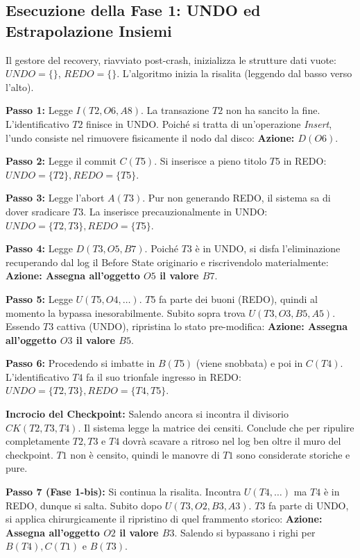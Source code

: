 \subsection{Esecuzione della Fase 1: UNDO ed Estrapolazione Insiemi}
Il gestore del recovery, riavviato post-crash, inizializza le strutture dati vuote: $UNDO=\{\}$, $REDO=\{\}$. L'algoritmo inizia la risalita (leggendo dal basso verso l'alto).

\textbf{Passo 1:} Legge $I(T2, O6, A8)$. La transazione $T2$ non ha sancito la fine. L'identificativo $T2$ finisce in UNDO. Poiché si tratta di un'operazione \textit{Insert}, l'undo consiste nel rimuovere fisicamente il nodo dal disco: \textbf{Azione: $D(O6)$}.

\textbf{Passo 2:} Legge il commit $C(T5)$. Si inserisce a pieno titolo $T5$ in REDO: $UNDO=\{T2\}, REDO=\{T5\}$.

\textbf{Passo 3:} Legge l'abort $A(T3)$. Pur non generando REDO, il sistema sa di dover sradicare $T3$. La inserisce precauzionalmente in UNDO: $UNDO=\{T2, T3\}, REDO=\{T5\}$.

\textbf{Passo 4:} Legge $D(T3, O5, B7)$. Poiché $T3$ è in UNDO, si disfa l'eliminazione recuperando dal log il Before State originario e riscrivendolo materialmente: \textbf{Azione: Assegna all'oggetto $O5$ il valore $B7$}.

\textbf{Passo 5:} Legge $U(T5, O4, \dots)$. $T5$ fa parte dei buoni (REDO), quindi al momento la bypassa inesorabilmente. Subito sopra trova $U(T3, O3, B5, A5)$. Essendo $T3$ cattiva (UNDO), ripristina lo stato pre-modifica: \textbf{Azione: Assegna all'oggetto $O3$ il valore $B5$}.

\textbf{Passo 6:} Procedendo si imbatte in $B(T5)$ (viene snobbata) e poi in $C(T4)$. L'identificativo $T4$ fa il suo trionfale ingresso in REDO: $UNDO=\{T2, T3\}, REDO=\{T4, T5\}$.

\textbf{Incrocio del Checkpoint:} Salendo ancora si incontra il divisorio \textbf{$CK(T2, T3, T4)$}. Il sistema legge la matrice dei censiti. Conclude che per ripulire completamente $T2, T3$ e $T4$ dovrà scavare a ritroso nel log ben oltre il muro del checkpoint. $T1$ non è censito, quindi le manovre di $T1$ sono considerate storiche e pure.

\textbf{Passo 7 (Fase 1-bis):} Si continua la risalita. Incontra $U(T4, \dots)$ ma $T4$ è in REDO, dunque si salta. Subito dopo $U(T3, O2, B3, A3)$. $T3$ fa parte di UNDO, si applica chirurgicamente il ripristino di quel frammento storico: \textbf{Azione: Assegna all'oggetto $O2$ il valore $B3$}.
Salendo si bypassano i righi per $B(T4), C(T1)$ e $B(T3)$.

